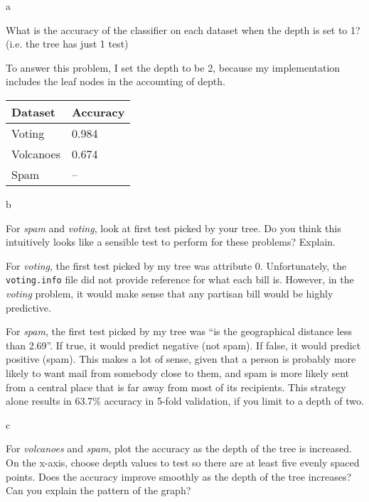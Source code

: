 \documentclass[fleqn]{homework}
\begin{document}
  \maketitle

  \begin{problem}{a}
    \begin{question}
      What is the accuracy of the classifier on each dataset when the depth is
      set to 1? (i.e. the tree has just 1 test)
    \end{question}
    To answer this problem, I set the depth to be 2, because my implementation
    includes the leaf nodes in the accounting of depth.

    \begin{tabular}{ll}
      Dataset & Accuracy \\
      \hline
      Voting & 0.984 \\
      Volcanoes & 0.674 \\
      Spam & -- \\
    \end{tabular}
  \end{problem}

  \begin{problem}{b}
    \begin{question}
      For \textit{spam} and \textit{voting}, look at first test picked by your
      tree. Do you think this intuitively looks like a sensible test to perform
      for these problems?  Explain.
    \end{question}

    For \textit{voting}, the first test picked by my tree was attribute 0.
    Unfortunately, the \texttt{voting.info} file did not provide reference for
    what each bill is.  However, in the \textit{voting} problem, it would make
    sense that any partisan bill would be highly predictive.

    For \textit{spam}, the first test picked by my tree was ``is the
    geographical distance less than 2.69''.  If true, it would predict negative
    (not spam).  If false, it would predict positive (spam).  This makes a lot
    of sense, given that a person is probably more likely to want mail from
    somebody close to them, and spam is more likely sent from a central place
    that is far away from most of its recipients.  This strategy alone results
    in 63.7\% accuracy in 5-fold validation, if you limit to a depth of two.
  \end{problem}

  \begin{problem}{c}
    \begin{question}
      For \textit{volcanoes} and \textit{spam}, plot the accuracy as the depth
      of the tree is increased. On the x-axis, choose depth values to test so
      there are at least five evenly spaced points. Does the accuracy improve
      smoothly as the depth of the tree increases? Can you explain the pattern
      of the graph?
    \end{question}
  \end{problem}
\end{document}
